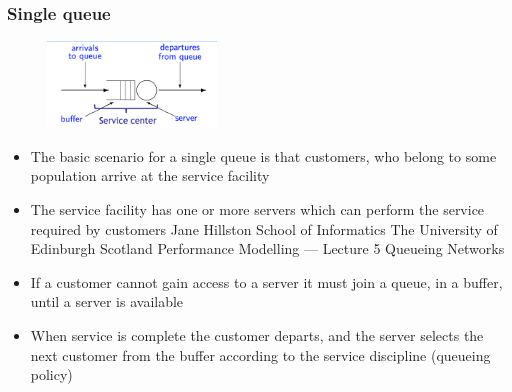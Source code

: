 \documentclass[10pt, oneside]{article}
\begin{document}
\subsubsection*{Single queue}
\begin{multicols}{2}
    \begin{figure}[H]
        \begin{center}
        \includegraphics[width=0.4\textwidth]{img/img94.png}
        \end{center}
    \end{figure}
    \columnbreak
    \begin{itemize}
        \item The basic scenario for a single queue is that customers, who belong to some population arrive at the service facility
        \item The service facility has one or more servers which can perform the service required by customers
        Jane Hillston School of Informatics The University of Edinburgh Scotland Performance Modelling — Lecture 5 Queueing Networks
        \item If a customer cannot gain access to a server it must join a queue, in a buffer, until a server is available
        \item When service is complete the customer departs, and the server selects the next customer from the buffer according to the service discipline (queueing policy)
    \end{itemize}
\end{multicols}\newpage
\end{document}
